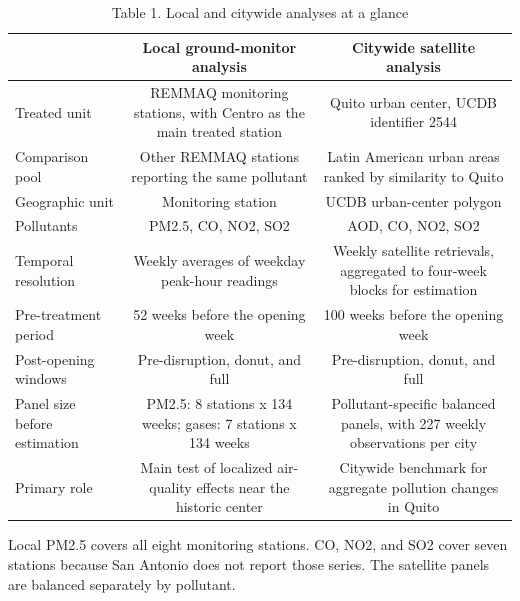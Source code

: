 \begin{table}[htbp]\centering
\begin{threeparttable}
\caption{Table 1. Local and citywide analyses at a glance}
\begin{tabular}{lcc}
\toprule
 & Local ground-monitor analysis & Citywide satellite analysis \\
\midrule
Treated unit & REMMAQ monitoring stations, with Centro as the main treated station & Quito urban center, UCDB identifier 2544 \\
Comparison pool & Other REMMAQ stations reporting the same pollutant & Latin American urban areas ranked by similarity to Quito \\
Geographic unit & Monitoring station & UCDB urban-center polygon \\
Pollutants & PM2.5, CO, NO2, SO2 & AOD, CO, NO2, SO2 \\
Temporal resolution & Weekly averages of weekday peak-hour readings & Weekly satellite retrievals, aggregated to four-week blocks for estimation \\
Pre-treatment period & 52 weeks before the opening week & 100 weeks before the opening week \\
Post-opening windows & Pre-disruption, donut, and full & Pre-disruption, donut, and full \\
Panel size before estimation & PM2.5: 8 stations x 134 weeks; gases: 7 stations x 134 weeks & Pollutant-specific balanced panels, with 227 weekly observations per city \\
Primary role & Main test of localized air-quality effects near the historic center & Citywide benchmark for aggregate pollution changes in Quito \\
\bottomrule
\end{tabular}
\begin{tablenotes}\footnotesize
\item Local PM2.5 covers all eight monitoring stations. CO, NO2, and SO2 cover seven stations because San Antonio does not report those series. The satellite panels are balanced separately by pollutant.
\end{tablenotes}
\end{threeparttable}
\end{table}
